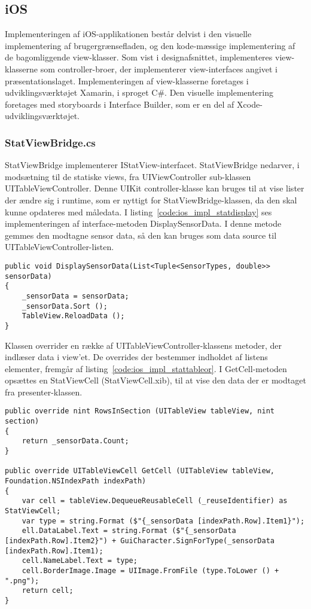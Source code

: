 \subsection{iOS}
Implementeringen af iOS-applikationen består delvist i den visuelle implementering af brugergrænsefladen, og den kode-mæssige implementering af de bagomliggende view-klasser. Som vist i designafsnittet, implementeres view-klasserne som controller-broer, der implementerer view-interfaces angivet i præsentationslaget. Implementeringen af view-klasserne foretages i udviklingsværktøjet Xamarin, i sproget C\#. Den visuelle implementering foretages med storyboards i Interface Builder, som er en del af Xcode-udviklingsværktøjet.

\subsubsection{StatViewBridge.cs}
StatViewBridge implementerer IStatView-interfacet. StatViewBridge nedarver, i modsætning til de statiske views, fra UIViewController sub-klassen UITableViewController. Denne UIKit controller-klasse kan bruges til at vise lister der ændre sig i runtime, som er nyttigt for StatViewBridge-klassen, da den skal kunne opdateres med måledata. I listing~\ref{code:ios_impl_statdisplay} ses implementeringen af interface-metoden DisplaySensorData. I denne metode gemmes den modtagne sensor data, så den kan bruges som data source til UITableViewController-listen.

\begin{lstlisting}[caption={DisplaySensorData(...)},label={code:ios_impl_statdisplay}]
public void DisplaySensorData(List<Tuple<SensorTypes, double>> sensorData)
{
	_sensorData = sensorData;
	_sensorData.Sort ();
	TableView.ReloadData ();
}
\end{lstlisting}

Klassen overrider en række af UITableViewController-klassens metoder, der indlæser data i view'et. De overrides der bestemmer indholdet af listens elementer, fremgår af listing~\ref{code:ios_impl_stattableor}. I GetCell-metoden opsættes en StatViewCell (StatViewCell.xib), til at vise den data der er modtaget fra presenter-klassen.

\begin{lstlisting}[caption={Overrides af UITableViewController-metoder i StatViewBridge},label={code:ios_impl_stattableor}]
public override nint RowsInSection (UITableView tableView, nint section)
{
	return _sensorData.Count;
}

public override UITableViewCell GetCell (UITableView tableView, Foundation.NSIndexPath indexPath)
{	
	var cell = tableView.DequeueReusableCell (_reuseIdentifier) as StatViewCell;
	var type = string.Format ($"{_sensorData [indexPath.Row].Item1}");
	ell.DataLabel.Text = string.Format ($"{_sensorData [indexPath.Row].Item2}") + GuiCharacter.SignForType(_sensorData [indexPath.Row].Item1);
	cell.NameLabel.Text = type;
	cell.BorderImage.Image = UIImage.FromFile (type.ToLower () + ".png");
	return cell;
}
\end{lstlisting}